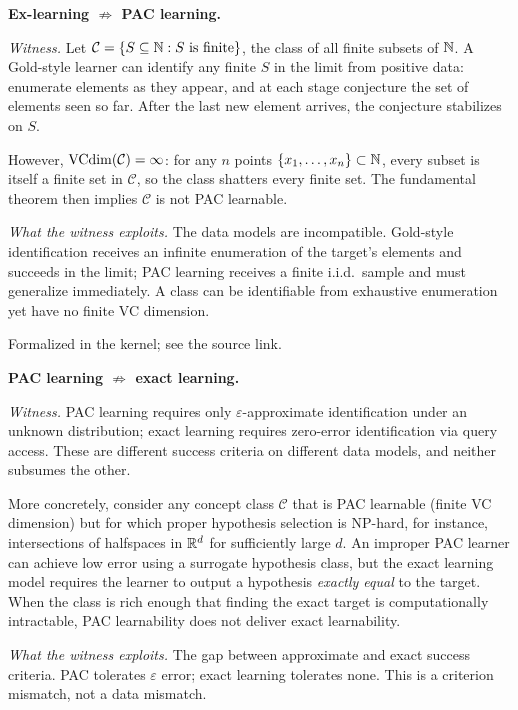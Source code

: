 \begin{separation}
\textbf{Ex-learning $\not\Rightarrow$ PAC learning.}

\medskip\noindent
\emph{Witness.}
Let $\mathcal{C} = \{ S \subseteq \mathbb{N} : S \text{ is finite} \}$, the
class of all finite subsets of $\mathbb{N}$. A Gold-style learner can identify
any finite $S$ in the limit from positive data: enumerate elements as
they appear, and at each stage conjecture the set of elements seen so
far. After the last new element arrives, the conjecture stabilizes on
$S$.

However, $\mathrm{VCdim}(\mathcal{C}) = \infty$: for any $n$ points
$\{x_1, \ldots, x_n\} \subset \mathbb{N}$, every subset is itself a finite set
in $\mathcal{C}$, so the class shatters every finite set. The
fundamental theorem then implies $\mathcal{C}$ is not PAC learnable.

\medskip\noindent
\emph{What the witness exploits.}
The data models are incompatible. Gold-style identification receives an
infinite enumeration of the target's elements and succeeds in the limit;
PAC learning receives a finite i.i.d.\ sample and must generalize
immediately. A class can be identifiable from exhaustive enumeration yet
have no finite VC dimension.

\hfill\cite{Gold1967}
\end{separation}

\begin{remark}\label{sep:gold-not-pac}
  \leanok
  Formalized in the kernel; see the source link.
\end{remark}


\begin{separation}
\textbf{PAC learning $\not\Rightarrow$ exact learning.}

\medskip\noindent
\emph{Witness.}
PAC learning requires only $\varepsilon$-approximate identification
under an unknown distribution; exact learning requires zero-error
identification via query access. These are different success criteria on
different data models, and neither subsumes the other.

More concretely, consider any concept class $\mathcal{C}$ that is PAC
learnable (finite VC dimension) but for which proper hypothesis
selection is NP-hard, for instance, intersections of halfspaces in
$\mathbb{R}^d$ for sufficiently large $d$. An improper PAC learner can achieve
low error using a surrogate hypothesis class, but the exact learning
model requires the learner to output a hypothesis \emph{exactly equal}
to the target. When the class is rich enough that finding the exact
target is computationally intractable, PAC learnability does not deliver
exact learnability.

\medskip\noindent
\emph{What the witness exploits.}
The gap between approximate and exact success criteria. PAC tolerates
$\varepsilon$ error; exact learning tolerates none. This is a
criterion mismatch, not a data mismatch.

\hfill\cite{Valiant1984}
\end{separation}

